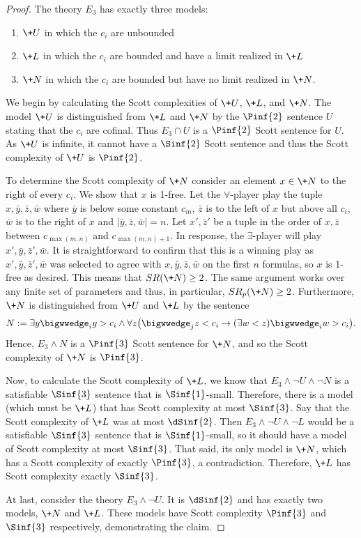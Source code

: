 \documentclass{amsart}
\renewcommand{\-}{\text{-}}
\begin{document}
\begin{proof}
The theory $E_3$ has exactly three models:
\begin{enumerate}
	\item $\+U$ in which the $c_i$ are unbounded
	\item $\+L$ in which the $c_i$ are bounded and have a limit realized in $\+L$
	\item $\+N$ in which the $c_i$ are bounded but have no limit realized in $\+N$.
\end{enumerate}
We begin by calculating the Scott complexities of $\+U$, $\+L$, and $\+N$.
The model $\+U$ is distinguished from $\+L$ and $\+N$ by the $\Pinf{2}$ sentence $U$ stating that the $c_i$ are cofinal. Thus $E_3\cap U$ is a $\Pinf{2}$ Scott sentence for $U$. As $\+U$ is infinite, it cannot have a $\Sinf{2}$ Scott sentence and thus the Scott complexity of $\+U$ is $\Pinf{2}$.

To determine the Scott complexity of $\+N$ consider an element $x\in \+N$ to the right of every $c_i$.
We show that $x$ is 1-free.
Let the $\forall$-player play the tuple $x,\bar y,\bar z,\bar w$ where $\bar y $ is below some constant $c_m$, $\bar z$ is to the left of $x$ but above all $c_i$, $\bar w$ is to the right of $x$ and $|\bar y,\bar z, \bar w|=n$.
Let $x',\bar{z}'$ be a tuple in the order of $x,\bar{z}$ between $c_{\max(m,n)}$ and $c_{\max(m,n)+1}$. 
In response, the $\exists$-player will play $x',\bar y,\bar z',\bar w$.
It is straightforward to confirm that this is a winning play as $x',\bar y,\bar z',\bar w$ was selected to agree with $x,\bar y,\bar z,\bar w$ on the first $n$ formulas, so $x$ is 1-free as desired.
This means that $SR(\+N)\geq 2$.
The same argument works over any finite set of parameters and thus, in particular, $SR_p(\+N)\geq 2$. %
Furthermore, $\+N$ is distinguished from $\+U$ and $\+L$ by the sentence 
\[N:=\exists y \bigwwedge_i y>c_i \land \forall z \big( \bigwwedge_j z<c_i \rightarrow (\exists w<z)  \bigwwedge_i w>c_i\big).\]
Hence, $E_3\land N$ is a $\Pinf{3}$ Scott sentence for $\+N$, and so the Scott complexity of $\+N$ is $\Pinf{3}$.

Now, to calculate the Scott complexity of $\+L$, we know that $E_3\land \lnot U\land \lnot N$ is a satisfiable $\Sinf{3}$ sentence that is $\Sinf{1}$-small.
Therefore, there is a model (which must be $\+L$) that has Scott complexity at most $\Sinf{3}$.
Say that the Scott complexity of $\+L$ was at most $\dSinf{2}$.
Then $E_3\land \lnot U\land \lnot L$ would be a satisfiable $\Sinf{3}$ sentence that is $\Sinf{1}$-small, so it should have a model of Scott complexity at most $\Sinf{3}$.
That said, its only model is $\+N$, which has a Scott complexity of exactly $\Pinf{3}$, a contradiction.
Therefore, $\+L$ has Scott complexity exactly $\Sinf{3}$.

At last, consider the theory $E_3\land\lnot U$.
It is $\dSinf{2}$ and has exactly two models, $\+N$ and $\+L$.
These models have Scott complexity $\Pinf{3}$ and $\Sinf{3}$ respectively, demonstrating the claim.
\end{proof}
\end{document}
